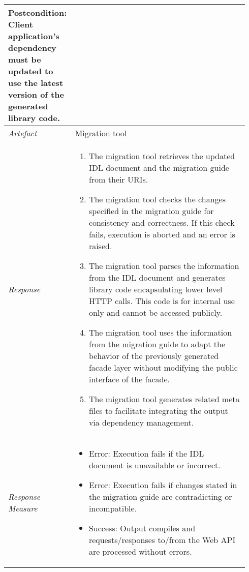 \begin{center}
\begin{longtable}{ p{0.22\linewidth} p{0.72\linewidth} }
    	\textbf{Postcondition:} Client application's dependency must be updated to use the latest version of the generated library code.
    	\\
    \hline
    	\textit{Artefact} & Migration tool\\
    \hline
    \textit{Response} &
    \vspace{-5.1mm}
    \begin{enumerate}[itemindent=-9pt, leftmargin=14pt, itemsep=0pt, align=left]
        \item The migration tool retrieves the updated IDL document and the migration guide from their URIs.
        \item The migration tool checks the changes specified in the migration guide for consistency and correctness. If this check fails, execution is aborted and an error is raised.
        \item The migration tool parses the information from the IDL document and generates library code encapsulating lower level HTTP calls. This code is for internal use only and cannot be accessed publicly.
        \item The migration tool uses the information from the migration guide to adapt the behavior of the previously generated facade layer without modifying the public interface of the facade.
        \item The migration tool generates related meta files to facilitate integrating the output via dependency management.
    \end{enumerate} \\ [-5mm]
    \hline
    \textit{Response Measure} &
    \vspace{-8.5mm}
    \begin{itemize}[itemindent=-9pt, leftmargin=14pt, itemsep=0pt, align=left]
    	\item Error: Execution fails if the IDL document is unavailable or incorrect.
       	\item Error: Execution fails if changes stated in the migration guide are contradicting or incompatible.
       	\item Success: Output compiles and requests/responses to/from the Web API are processed without errors. 
        \vspace{-5mm}
    \end{itemize}\\
    \hline
    \end{longtable}
\end{center}